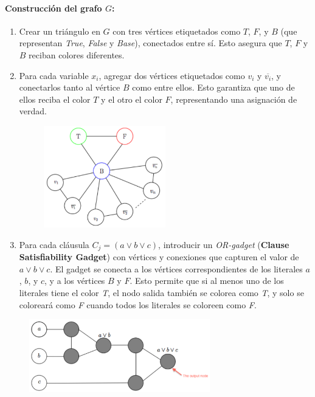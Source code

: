 \documentclass[a4paper,12pt]{article}
\begin{document}
\paragraph{Construcci\'on del grafo $G$:}
\begin{enumerate}
    \item Crear un tri\'angulo en $G$ con tres v\'ertices etiquetados como $T$, $F$, y $B$ (que representan \textit{True}, \textit{False} y \textit{Base}), conectados entre s\'i. Esto asegura que $T$, $F$ y $B$ reciban colores diferentes.
    \item Para cada variable $x_i$, agregar dos v\'ertices etiquetados como $v_i$ y $\overline{v_i}$, y conectarlos tanto al v\'ertice $B$ como entre ellos. Esto garantiza que uno de ellos reciba el color $T$ y el otro el color $F$, representando una asignaci\'on de verdad.
    
\begin{figure}[h]
    \centering
    \includegraphics[width=0.5\textwidth]{assets/3-colTFB.png}
\end{figure}

    \item Para cada cl\'ausula $C_j = (a \vee b \vee c)$, introducir un \textit{OR-gadget} (\textbf{Clause Satisfiability Gadget}) con v\'ertices y conexiones que capturen el valor de $a \vee b \vee c$. El gadget se conecta a los v\'ertices correspondientes de los literales $a$, $b$, y $c$, y a los v\'ertices $B$ y $F$. Esto permite que si al menos uno de los literales tiene el color \textit{T}, el nodo salida también se colorea como \textit{T}, y solo se coloreará como \textit{F} cuando todos los literales se coloreen como \textit{F}.
\end{enumerate}

\begin{figure}[h]
    \centering
    \includegraphics[width=0.7\textwidth]{assets/3-colOR-gadget.png}
\end{figure}
\end{document}
